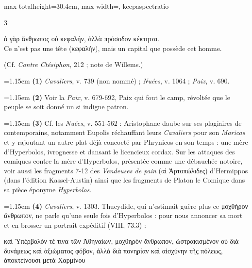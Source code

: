 \documentclass[11pt,twoside]{book}
\newcommand{\italique}[1]{\textit{#1}}
\newcommand{\citComm}[1]{\begin{quoting}[vskip=0.4pt,leftmargin=0.7em,rightmargin=0.2em]#1\end{quoting}}
\begin{document}
\begin{adjustbox}{max totalheight=30.4cm, max width=\textwidth, keepaspectratio}
\begin{minipage}{\textwidth}
{\begin{multicols}{3}
\citComm{ὁ γὰρ ἄνθρωπος οὐ κεφαλήν, ἀλλὰ πρόσοδον κέκτηται.\\
Ce n'est pas une tête (κεφαλήν), mais un capital que possède cet homme.}
\par\vspace{1.5pt}
\noindent (Cf. \italique{Contre Ctésiphon}, 212 ; note de Willems.)
\par\vspace{1.5pt}
\par\vspace{1.2pt}\par\nopagebreak\vspace{1pt}\noindent\hangindent=1.15em {\color{sepiaNote}\textbf{(1)}} \italique{Cavaliers}, v. 739 (non nommé) ; \italique{Nuées}, v. 1064 ; \italique{Paix}, v. 690.
\par\vspace{1.5pt}
\noindent\hangindent=1.15em {\color{sepiaNote}\textbf{(2)}} Voir la \italique{Paix}, v. 679-692, Paix qui fout le camp, révoltée que le peuple se soit donné un si indigne patron.
\par\vspace{1.5pt}
\noindent\hangindent=1.15em {\color{sepiaNote}\textbf{(3)}} Cf. les \italique{Nuées}, v. 551-562 : Aristophane daube sur ses plagiaires de contemporains, notamment Eupolis réchauffant leurs \italique{Cavaliers} pour son \italique{Maricas} et y rajoutant un autre plat déjà concocté par Phrynicos en son temps : une mère d'Hyperbolos, ivrognesse et dansant le licencieux cordax. Sur les attaques des comiques contre la mère d'Hyperbolos, présentée comme une débauchée notoire, voir aussi les fragments 7-12 des \italique{Vendeuses de pain} (αἱ Ἀρτοπώλιδες) d'Hermippos (dans l'édition Kassel-Austin) ainsi que les fragments de Platon le Comique dans sa pièce éponyme \italique{Hyperbolos}.
\par\vspace{1.5pt}
\noindent\hangindent=1.15em {\color{sepiaNote}\textbf{(4)}} \italique{Cavaliers}, v. 1303. Thucydide, qui n'estimait guère plus ce μοχθὴρον ἄνθρωπον, ne parle qu'une seule fois d'Hyperbolos : pour nous annoncer sa mort et en brosser un portrait expéditif (VIII, 73.3) :
\citComm{καὶ Ὑπέρβολόν τέ τινα τῶν Ἀθηναίων, μοχθηρὸν ἄνθρωπον, ὠστρακισμένον οὐ διὰ δυνάμεως καὶ ἀξιώματος φόβον, ἀλλὰ διὰ πονηρίαν καὶ αἰσχύνην τῆς πόλεως, ἀποκτείνουσι μετὰ Χαρμίνου\\
}
\end{multicols}}
\end{minipage}
\end{adjustbox}
\end{document}
